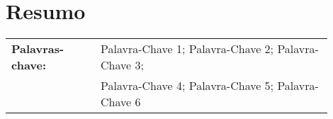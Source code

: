 \section*{Resumo}


\lipsum[1-2]

%
\vfill
%
{\centering %
\begin{tabular}{p{0.25\linewidth} p{0.65\linewidth}}
	\textbf{\Large Palavras-chave:} & Palavra-Chave 1; Palavra-Chave 2; Palavra-Chave 3; \\%
									& Palavra-Chave 4; Palavra-Chave 5; Palavra-Chave 6    %
\end{tabular}
}